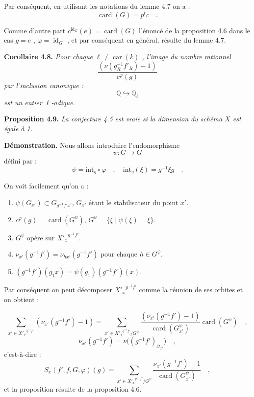\documentclass[11pt]{article}
\newcommand{\car}{\operatorname{car}}
\providecommand{\car}{\operatorname{car}}
\providecommand{\id}{\operatorname{id}}
\providecommand{\id}{\operatorname{id}}
\providecommand{\id}{\operatorname{id}}
\providecommand{\car}{\operatorname{car}}
\providecommand{\id}{\operatorname{id}}
\providecommand{\id}{\operatorname{id}}
\providecommand{\bQ}{\mathbb Q}
\providecommand{\card}{\operatorname{card}}
\providecommand{\car}{\operatorname{car}}
\providecommand{\id}{\operatorname{id}}
\begin{document}
Par conséquent, en utilisant les notations du lemme 4.7 on a :
\[
\card(G) = p^t c \quad .
\]

Comme d'autre part $c^{\id_G}(e) = \card(G)$ l'énoncé de la proposition 4.6 dans le cas $g = e$ , $\varphi = \id_G$ , et par conséquent en général, résulte du lemme 4.7.

\medskip
\noindent
\textbf{Corollaire 4.8.} \emph{Pour chaque $\ell \neq \car(k)$ , l'image du nombre rationnel
\[
\frac{(\nu(g_R^{-1}f'_R) - 1)}{c^\varphi(g)}
\]
par l'inclusion canonique :
\[
\bQ \hookrightarrow \bQ_\ell
\]
est un entier $\ell$-adique.}

\medskip
\noindent
\textbf{Proposition 4.9.} \emph{La conjecture 4.5 est vraie si la dimension du schéma $X$ est égale à 1.}

\medskip

\noindent
\textbf{Démonstration.} Nous allons introduire l'endomorphisme
\[
\psi : G \longrightarrow G
\]
défini par :
\[
\psi = \mathrm{int}_g \circ \varphi \quad , \quad \mathrm{int}_g(\xi) = g^{-1}\xi g \quad .
\]

On voit facilement qu'on a :
\begin{enumerate}
\item[i)] $\psi(G_{x'}) \subset G_{g^{-1}f'x'}$, $G_{x'}$ étant le stabilisateur du point $x'$.
\item[ii)] $c^\varphi(g) = \card(G^\psi)$, $G^\psi = \{ \xi \mid \psi(\xi) = \xi \}$.
\item[iii)] $G^\psi$ opère sur ${X'_x}^{g^{-1}f'}$.
\item[iv)] $\nu_{x'}(g^{-1}f') = \nu_{hx'}(g^{-1}f')$ pour chaque $h \in G^\psi$.
\item[v)] $(g^{-1}f')(g_1x) = \psi(g_1)(g^{-1}f')(x)$.
\end{enumerate}

Par conséquent on peut décomposer ${X'_x}^{g^{-1}f'}$ comme la réunion de ses orbites et on obtient :

\begin{equation}\tag{4.9.1}
\sum_{x' \in {X'_x}^{g^{-1}f'}} (\nu_{x'}(g^{-1}f') - 1) = \sum_{x' \in {X'_x}^{g^{-1}f'}/G^\psi} \frac{(\nu_{x'}(g^{-1}f') - 1)}{\card(G^\psi_{x'})} \card(G^\psi) \quad ,
\end{equation}
\[
\nu_{x'}(g^{-1}f')=\nu\bigl((g^{-1}f')_{\mathcal{O}_{x'}}\bigr) \quad ,
\]
c'est-à-dire :
\begin{equation}\tag{4.9.2}
S_x(f',f,G,\varphi)(g)=\sum_{x' \in {X'_x}^{g^{-1}f'}/G^\psi}
\frac{\nu_{x'}(g^{-1}f')-1}{\card(G^\psi_{x'})} \quad ,
\end{equation}
et la proposition résulte de la proposition 4.6.
\end{document}

